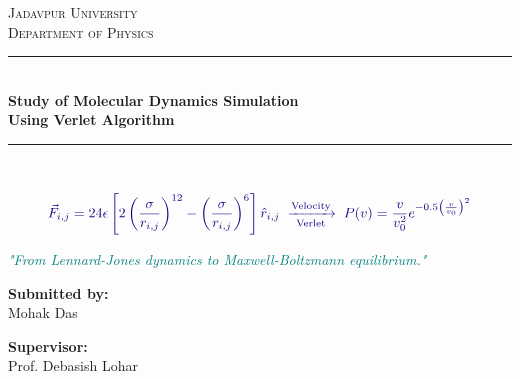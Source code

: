 \documentclass[12pt, a4paper, oneside]{article}
\begin{document}
    \begin{titlepage}
        \centering

        \vspace*{\fill}
        \Huge \textsc{\textcolor{deeppurple}{Jadavpur University}}\\
        \LARGE \textsc{Department of Physics}\\[1cm]

        \textcolor{deeppurple}{\rule{\linewidth}{0.8mm}} \\[0.4cm] 
        \Huge \textbf{\textcolor{deeppurple}{Study of Molecular Dynamics Simulation \\ Using Verlet Algorithm}} \\[0.2cm]
        \textcolor{deeppurple}{\rule{\linewidth}{0.8mm}} \\[1.5cm] 
        
        \begin{tcolorbox}[colback=deeppurple!5!white, colframe=deeppurple, width=0.8\textwidth, boxrule=0.5mm, arc=2mm, auto outer arc]
            \centering \normalsize
            \begin{equation*}
                \textcolor{deeppurple}{\vec{F}_{i,j} = 24\epsilon \left[ 2\left(\frac{\sigma}{r_{i,j}}\right)^{12} - \left(\frac{\sigma}{r_{i,j}}\right)^{6}\right] \hat{r}_{i,j} \hspace{0.1cm} \xrightarrow[\text{Verlet}]{\text{Velocity}} \hspace{0.1cm} P(v) = \frac{v}{v_0^2} e^{-0.5 \left(\frac{v}{v_0}\right)^2}}
            \end{equation*}
        \end{tcolorbox}
        \normalsize \textit{\textcolor{teal}{"From Lennard-Jones dynamics to Maxwell-Boltzmann equilibrium."}}\\[0.5cm]
        
        \vspace{2cm}

        \noindent
        \begin{minipage}{0.4\textwidth}
            \begin{flushleft} \Large
                \textbf{Submitted by:}\\
                \textcolor{deeppurple}{Mohak Das}\\
            \end{flushleft}
        \end{minipage}
        \begin{minipage}{0.4\textwidth}
            \begin{flushright} \Large
                \textbf{Supervisor:} \\
                Prof. Debasish Lohar\\
                \vspace{0.6cm}
            \end{flushright}
        \end{minipage}
        \vspace{1.5cm}


\end{titlepage}
\end{document}
